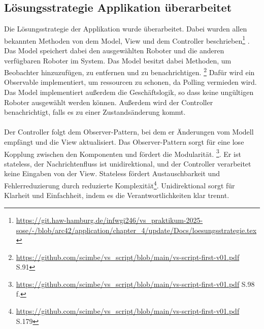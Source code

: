 \documentclass{article}
\begin{document}
\subsection{Lösungsstrategie Applikation überarbeitet}
Die Lösungsstrategie der Applikation wurde überarbeitet. Dabei wurden allen bekannten Methoden von dem Model, View und dem Controller beschrieben\footnote{\url{https://git.haw-hamburg.de/infwgi246/vs_praktikum-2025-sose/-/blob/arc42/application/chapter_4/update/Docs/loesungsstrategie.tex}} . 
Das Model speichert dabei den ausgewählten Roboter und die anderen verfügbaren Roboter im System. Das Model besitzt dabei Methoden, um Beobachter hinzuzufügen, zu entfernen und zu benachrichtigen. \footnote{\url{https://github.com/scimbe/vs_script/blob/main/vs-script-first-v01.pdf} S.91} 
Dafür wird ein Observable implementiert, um ressourcen zu schonen, da Polling vermieden wird.  
Das Model implementiert außerdem die Geschäftslogik, so dass keine ungültigen Roboter ausgewählt werden können. Außerdem wird der Controller benachrichtigt, falls es zu einer Zustandsänderung kommt.
\\\\
Der Controller folgt dem Observer-Pattern, bei dem er Änderungen vom Modell empfängt und die View aktualisiert. 
Das Observer-Pattern sorgt für eine lose Kopplung zwischen den Komponenten und fördert die Modularität.
\footnote{\url{https://github.com/scimbe/vs_script/blob/main/vs-script-first-v01.pdf} S.98 f.}.
Er ist stateless, der Nachrichtenfluss ist unidirektional, und der Controller verarbeitet keine Eingaben von der View.
Stateless fördert Austauschbarkeit und Fehlerreduzierung durch reduzierte Komplexität\footnote{\url{https://github.com/scimbe/vs_script/blob/main/vs-script-first-v01.pdf} S.179}.
Unidirektional sorgt für Klarheit und Einfachheit, indem es die Verantwortlichkeiten klar trennt.
\end{document}
